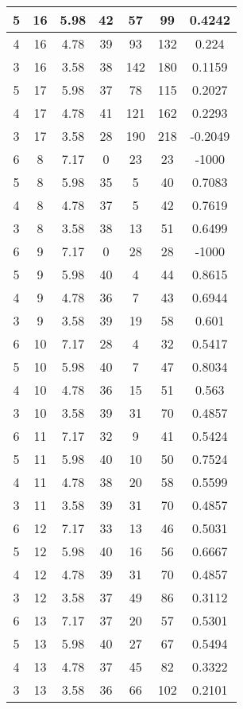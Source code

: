 \documentclass[letterpaper, 12pt]{article}
\begin{document}
\begin{longtable}{|c|c|c|c|c|c|c|}
\hline
5 & 16 & 5.98 & 42 & 57 & 99 & 0.4242 \\
\hline
4 & 16 & 4.78 & 39 & 93 & 132 & 0.224 \\
\hline
3 & 16 & 3.58 & 38 & 142 & 180 & 0.1159 \\
\hline
5 & 17 & 5.98 & 37 & 78 & 115 & 0.2027 \\
\hline
4 & 17 & 4.78 & 41 & 121 & 162 & 0.2293 \\
\hline
3 & 17 & 3.58 & 28 & 190 & 218 & -0.2049 \\
\hline
6 & 8 & 7.17 & 0 & 23 & 23 & -1000 \\
\hline
5 & 8 & 5.98 & 35 & 5 & 40 & 0.7083 \\
\hline
4 & 8 & 4.78 & 37 & 5 & 42 & 0.7619 \\
\hline
3 & 8 & 3.58 & 38 & 13 & 51 & 0.6499 \\
\hline
6 & 9 & 7.17 & 0 & 28 & 28 & -1000 \\
\hline
5 & 9 & 5.98 & 40 & 4 & 44 & 0.8615 \\
\hline
4 & 9 & 4.78 & 36 & 7 & 43 & 0.6944 \\
\hline
3 & 9 & 3.58 & 39 & 19 & 58 & 0.601 \\
\hline
6 & 10 & 7.17 & 28 & 4 & 32 & 0.5417 \\
\hline
5 & 10 & 5.98 & 40 & 7 & 47 & 0.8034 \\
\hline
4 & 10 & 4.78 & 36 & 15 & 51 & 0.563 \\
\hline
3 & 10 & 3.58 & 39 & 31 & 70 & 0.4857 \\
\hline
6 & 11 & 7.17 & 32 & 9 & 41 & 0.5424 \\
\hline
5 & 11 & 5.98 & 40 & 10 & 50 & 0.7524 \\
\hline
4 & 11 & 4.78 & 38 & 20 & 58 & 0.5599 \\
\hline
3 & 11 & 3.58 & 39 & 31 & 70 & 0.4857 \\
\hline
6 & 12 & 7.17 & 33 & 13 & 46 & 0.5031 \\
\hline
5 & 12 & 5.98 & 40 & 16 & 56 & 0.6667 \\
\hline
4 & 12 & 4.78 & 39 & 31 & 70 & 0.4857 \\
\hline
3 & 12 & 3.58 & 37 & 49 & 86 & 0.3112 \\
\hline
6 & 13 & 7.17 & 37 & 20 & 57 & 0.5301 \\
\hline
5 & 13 & 5.98 & 40 & 27 & 67 & 0.5494 \\
\hline
4 & 13 & 4.78 & 37 & 45 & 82 & 0.3322 \\
\hline
3 & 13 & 3.58 & 36 & 66 & 102 & 0.2101 \\

\end{longtable}
\end{document}
